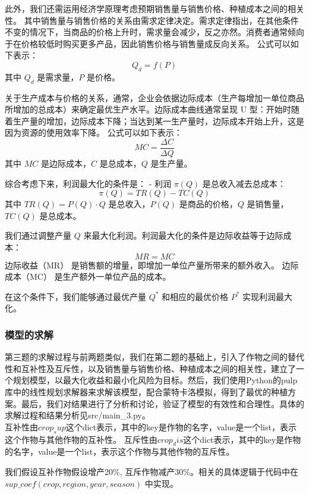 \documentclass{cumcmthesis}
\begin{document}
此外，我们还需运用经济学原理考虑预期销售量与销售价格、种植成本之间的相关性。
其中销售量与销售价格的关系由需求定律决定。需求定律指出，在其他条件不变的情况下，当商品的价格上升时，需求量会减少，反之亦然。消费者通常倾向于在价格较低时购买更多产品，因此销售价格与销售量成反向关系。
公式可以如下表示：  
  \[ Q_d = f(P) \]
  其中 \( Q_d \) 是需求量，\( P \) 是价格。
  
关于生产成本与价格的关系，通常，企业会依据边际成本（生产每增加一单位商品所增加的总成本）来确定最优生产水平。边际成本曲线通常呈现 U 型：开始时随着生产量的增加，边际成本下降；当达到某一生产量时，边际成本开始上升，这是因为资源的使用效率下降。
公式可以如下表示：  
\[ MC = \frac{\Delta C}{\Delta Q} \]
其中 \( MC \) 是边际成本，\( C \) 是总成本，\( Q \) 是生产量。

综合考虑下来，利润最大化的条件是：
- 利润 \( \pi(Q) \) 是总收入减去总成本：
  \[
  \pi(Q) = TR(Q) - TC(Q)
  \]
  其中 \( TR(Q) = P(Q) \cdot Q \) 是总收入，\( P(Q) \) 是商品的价格，\( Q \) 是销售量，\( TC(Q) \) 是总成本。

我们通过调整产量 \( Q \) 来最大化利润。利润最大化的条件是边际收益等于边际成本：
  \[
  MR = MC
  \]
  边际收益（MR） 是销售额的增量，即增加一单位产量所带来的额外收入。
  边际成本（MC） 是生产额外一单位产品的成本。

在这个条件下，我们能够通过最优产量 \( Q^* \) 和相应的最优价格 \( P^* \) 实现利润最大化。


\subsubsection{模型的求解}
第三题的求解过程与前两题类似，我们在第二题的基础上，引入了作物之间的替代性和互补性及互斥性，以及销售量与销售价格、种植成本之间的相关性，建立了一个规划模型，以最大化收益和最小化风险为目标。然后，我们使用Python的pulp库中的线性规划求解器来求解该模型，配合蒙特卡洛模拟，得到了最优的种植方案。最后，我们对结果进行了分析和讨论，验证了模型的有效性和合理性。具体的求解过程和结果分析见src/main\_3.py。\\

互补性由$ crop_sup $这个dict表示，其中的key是作物的名字，value是一个list，表示这个作物与其他作物的互补性。
互斥性由$ crop_dis $这个dict表示，其中的key是作物的名字，value是一个list，表示这个作物与其他作物的互斥性。
  
我们假设互补作物假设增产20\%, 互斥作物减产30\%。相关的具体逻辑于代码中在$ sup\_coef(crop, region, year, season) $ 中实现。\\
\end{document}
